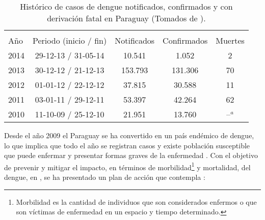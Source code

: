 \begin{table}[!htpb]
    \begin{minipage}{\textwidth}
        \begin{center}
        \caption{\label{tab:cap3-historico-casos-dengue} Histórico de casos de dengue notificados, confirmados y con derivación fatal en Paraguay (Tomados de \citep{website:mspbsHistoria2014}).}
        \begin{tabular}{l c c c c}
            \hline\\
            Año & Periodo (inicio / fin) & Notificados & Confirmados & Muertes\\
            \hline
            \hline
            2014 & 29-12-13 / 31-05-14 & 10.541 & 1.052 & 2\\
            2013 & 30-12-12 / 21-12-13 & 153.793 & 131.306 & 70\\
            2012 & 01-01-12 / 22-12-12 & 37.815 & 30.588 & 11\\
            2011 & 03-01-11 / 29-12-11 & 53.397 & 42.264 & 62\\
            2010 & 11-10-09 / 25-12-10 & 21.951 & 13.760 & --$^a$\\
        \end{tabular}
        \end{center}
    \end{minipage}
\end{table}

Desde el año 2009 el Paraguay se ha convertido en un país endémico de dengue, lo que implica que
todo el año se registran casos y existe población susceptible que puede enfermar y presentar
formas graves de la enfermedad \cite{planControlMspbs2014}. Con el objetivo de prevenir y mitigar
el impacto, en términos de morbilidad\footnote{Morbilidad es la cantidad de individuos que son
considerados enfermos o que son víctimas de enfermedad en un espacio y tiempo determinado.} y
mortalidad, del dengue, en \cite{planControlMspbs2014}, se ha presentado un plan de acción que
contempla :


